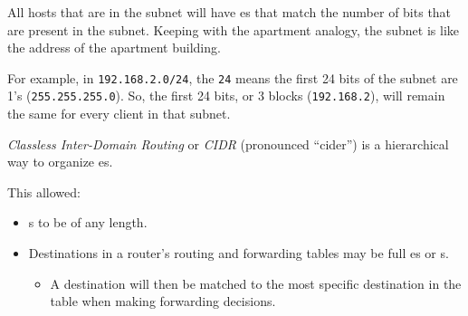 \begin{definition}[Subnet]\label{def:Subnet}
  All hosts that are in the subnet will have es that match the number of bits that are present in the subnet.
  Keeping with the apartment analogy, the subnet is like the address of the apartment building.

  For example, in \texttt{192.168.2.0/24}, the \texttt{24} means the first 24 bits of the subnet are 1's (\texttt{255.255.255.0}).
  So, the first 24 bits, or 3  blocks (\texttt{192.168.2}), will remain the same for every client in that subnet.
\end{definition}

\begin{definition}\label{def:Classless_Interdomain_Routing}
  \emph{Classless Inter-Domain Routing} or \emph{CIDR} (pronounced ``cider'') is a hierarchical way to organize es.
  
  This allowed:
  \begin{itemize}[noitemsep]
  \item {}s to be of any length.
  \item Destinations in a router’s routing and forwarding tables may be full es or s.
    \begin{itemize}[noitemsep]
    \item A destination  will then be matched to the most specific destination in the table when making forwarding decisions.
    \end{itemize}
  \end{itemize}
\end{definition}


